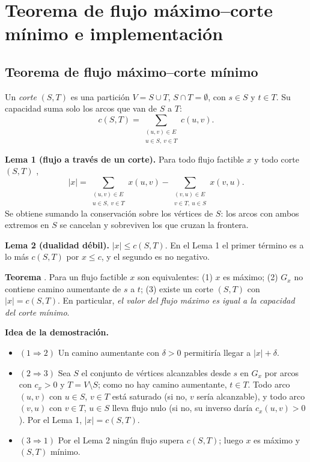 \documentclass[12pt, a4paper]{article}
\begin{document}
\section{Teorema de flujo máximo--corte mínimo e implementación}

\subsection{Teorema de flujo máximo--corte mínimo}

Un \emph{corte} $(S,T)$ es una partición $V = S \cup T$, $S \cap T = \emptyset$, con $s \in S$ y $t \in T$. Su capacidad suma solo los arcos que van de $S$ a $T$:
\[
  c(S,T) = \sum_{\substack{(u,v)\in E\\ u\in S,\ v\in T}} c(u,v).
\]

\textbf{Lema 1 (flujo a través de un corte).} Para todo flujo factible $x$ y todo corte $(S,T)$ \cite{clrs2009, kleinberg2006},
\[
  \lvert x\rvert = \sum_{\substack{(u,v)\in E\\ u\in S,\ v\in T}} x(u,v) - \sum_{\substack{(v,u)\in E\\ v\in T,\ u\in S}} x(v,u).
\]
Se obtiene sumando la conservación sobre los vértices de $S$: los arcos con ambos extremos en $S$ se cancelan y sobreviven los que cruzan la frontera.

\textbf{Lema 2 (dualidad débil).} $\lvert x\rvert \le c(S,T)$. En el Lema 1 el primer término es a lo más $c(S,T)$ por $x \le c$, y el segundo es no negativo.

\textbf{Teorema} \cite{ford1956}. Para un flujo factible $x$ son equivalentes: (1) $x$ es máximo; (2) $G_x$ no contiene camino aumentante de $s$ a $t$; (3) existe un corte $(S,T)$ con $\lvert x\rvert = c(S,T)$. En particular, \emph{el valor del flujo máximo es igual a la capacidad del corte mínimo}.

\textbf{Idea de la demostración.}
\begin{itemize}
  \item $(1\Rightarrow 2)$ Un camino aumentante con $\delta>0$ permitiría llegar a $\lvert x\rvert+\delta$.
  \item $(2\Rightarrow 3)$ Sea $S$ el conjunto de vértices alcanzables desde $s$ en $G_x$ por arcos con $c_x>0$ y $T = V\setminus S$; como no hay camino aumentante, $t\in T$. Todo arco $(u,v)$ con $u\in S$, $v\in T$ está saturado (si no, $v$ sería alcanzable), y todo arco $(v,u)$ con $v\in T$, $u\in S$ lleva flujo nulo (si no, su inverso daría $c_x(u,v)>0$). Por el Lema 1, $\lvert x\rvert = c(S,T)$.
  \item $(3\Rightarrow 1)$ Por el Lema 2 ningún flujo supera $c(S,T)$; luego $x$ es máximo y $(S,T)$ mínimo.
\end{itemize}
\end{document}

